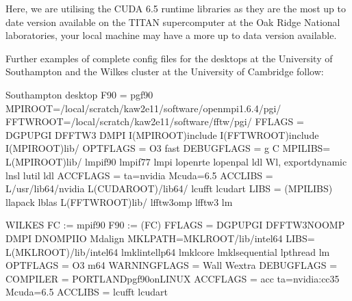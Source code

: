 \documentclass[letterpaper,10pt,english]{sphinxmanual}
\begin{document}
Here, we are utilising the CUDA 6.5 runtime libraries as they are the
most up to date version available on the TITAN supercomputer at the Oak
Ridge National laboratories, your local machine may have a more up to
data version available.

Further examples of complete config files for the desktops at the
University of Southampton and the Wilkes cluster at the University of
Cambridge follow:

%
\begin{sphinxVerbatim}[commandchars=\\\{\}]
\PYGZsh{}\PYGZsh{}\PYGZsh{}\PYGZsh{}\PYGZsh{}\PYGZsh{}\PYGZsh{}\PYGZsh{}\PYGZsh{}\PYGZsh{}\PYGZsh{}\PYGZsh{}\PYGZsh{}\PYGZsh{}\PYGZsh{}\PYGZsh{}  Southampton desktop \PYGZsh{}\PYGZsh{}\PYGZsh{}\PYGZsh{}\PYGZsh{}\PYGZsh{}\PYGZsh{}\PYGZsh{}\PYGZsh{}\PYGZsh{}\PYGZsh{}\PYGZsh{}\PYGZsh{}\PYGZsh{}\PYGZsh{}\PYGZsh{}
F90 = pgf90
MPIROOT=/local/scratch/kaw2e11/software/openmpi\PYGZus{}1.6.4/pgi/
FFTWROOT=/local/scratch/kaw2e11/software/fftw/pgi/
FFLAGS = \PYGZhy{}DGPU\PYGZus{}PGI \PYGZhy{}DFFTW3 \PYGZhy{}DMPI \PYGZhy{}I\PYGZdl{}(MPIROOT)include \PYGZhy{}I\PYGZdl{}(FFTWROOT)include \PYGZhy{}I\PYGZdl{}(MPIROOT)lib/
OPTFLAGS = \PYGZhy{}O3 \PYGZhy{}fast
DEBUGFLAGS = \PYGZhy{}g \PYGZhy{}C
MPILIBS= \PYGZhy{}L\PYGZdl{}(MPIROOT)lib/ \PYGZhy{}lmpi\PYGZus{}f90 \PYGZhy{}lmpi\PYGZus{}f77 \PYGZhy{}lmpi \PYGZhy{}lopen\PYGZhy{}rte \PYGZhy{}lopen\PYGZhy{}pal \PYGZhy{}ldl \PYGZhy{}Wl,
\PYGZhy{}\PYGZhy{}export\PYGZhy{}dynamic \PYGZhy{}lnsl \PYGZhy{}lutil \PYGZhy{}ldl
ACCFLAGS = \PYGZhy{}ta=nvidia \PYGZhy{}Mcuda=6.5
ACCLIBS = \PYGZhy{}L/usr/lib64/nvidia \PYGZhy{}L\PYGZdl{}(CUDAROOT)/lib64/ \PYGZhy{}lcufft \PYGZhy{}lcudart
LIBS = \PYGZdl{}(MPILIBS) \PYGZhy{}llapack \PYGZhy{}lblas \PYGZhy{}L\PYGZdl{}(FFTWROOT)lib/ \PYGZhy{}lfftw3\PYGZus{}omp \PYGZhy{}lfftw3 \PYGZhy{}lm
\end{sphinxVerbatim}

%
\begin{sphinxVerbatim}[commandchars=\\\{\}]
\PYGZsh{}\PYGZsh{}\PYGZsh{}\PYGZsh{}\PYGZsh{}\PYGZsh{}\PYGZsh{}\PYGZsh{}\PYGZsh{}\PYGZsh{}\PYGZsh{}\PYGZsh{}\PYGZsh{}\PYGZsh{}\PYGZsh{}\PYGZsh{} WILKES \PYGZsh{}\PYGZsh{}\PYGZsh{}\PYGZsh{}\PYGZsh{}\PYGZsh{}\PYGZsh{}\PYGZsh{}\PYGZsh{}\PYGZsh{}\PYGZsh{}\PYGZsh{}\PYGZsh{}\PYGZsh{}\PYGZsh{}\PYGZsh{}
FC := mpif90
F90 := \PYGZdl{}(FC)
FFLAGS = \PYGZhy{}DGPU\PYGZus{}PGI \PYGZhy{}DFFTW3\PYGZus{}NO\PYGZus{}OMP \PYGZhy{}DMPI \PYGZhy{}DNOMPIIO \PYGZhy{}Mdalign
MKLPATH=\PYGZdl{}\PYGZob{}MKLROOT\PYGZcb{}/lib/intel64
LIBS=  \PYGZhy{}L\PYGZdl{}(MKLROOT)/lib/intel64 \PYGZhy{}lmkl\PYGZus{}intel\PYGZus{}lp64 \PYGZhy{}lmkl\PYGZus{}core \PYGZhy{}lmkl\PYGZus{}sequential \PYGZhy{}lpthread \PYGZhy{}lm
OPTFLAGS = \PYGZhy{}O3 \PYGZhy{}m64
WARNINGFLAGS = \PYGZhy{}Wall \PYGZhy{}Wextra
DEBUGFLAGS =
COMPILER = PORTLAND\PYGZhy{}pgf90\PYGZhy{}on\PYGZhy{}LINUX
ACCFLAGS = \PYGZhy{}acc \PYGZhy{}ta=nvidia:cc35 \PYGZhy{}Mcuda=6.5
ACCLIBS = \PYGZhy{}lcufft \PYGZhy{}lcudart
\end{sphinxVerbatim}
\end{document}
